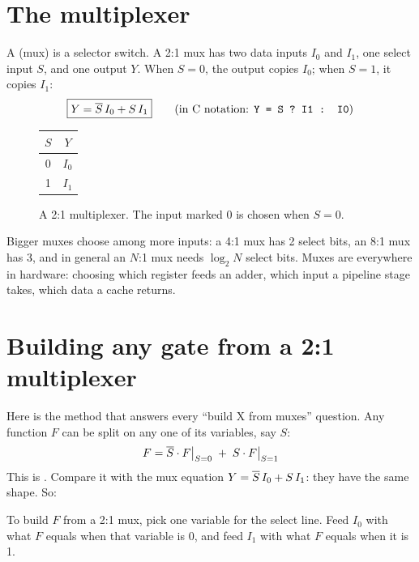 \section{The multiplexer}

A  (mux) is a selector switch. A 2:1 mux has two data inputs $I_0$ and $I_1$, one select input $S$, and one output $Y$. When $S = 0$, the output copies $I_0$; when $S = 1$, it copies $I_1$:
\[
  \boxed{Y = \overline{S}\,I_0 + S\,I_1} \qquad\text{(in C notation: \texttt{Y = S ? I1 : I0})}
\]

\begin{figure}[h]
\centering
{}
\hspace{1.5cm}
\begin{tabular}[b]{c|c}
\toprule
$S$ & $Y$ \\
\midrule
0 & $I_0$ \\
1 & $I_1$ \\
\bottomrule
\end{tabular}
\caption{A 2:1 multiplexer. The input marked 0 is chosen when $S = 0$.}
\label{fig:mux}
\end{figure}

Bigger muxes choose among more inputs: a 4:1 mux has 2 select bits, an 8:1 mux has 3, and in general an $N$:1 mux needs $\log_2 N$ select bits. Muxes are everywhere in hardware: choosing which register feeds an adder, which input a pipeline stage takes, which data a cache returns.

\section{Building any gate from a 2:1 multiplexer}
\label{sec:muxgates}

Here is the method that answers every ``build X from muxes'' question. Any function $F$ can be split on any one of its variables, say $S$:
\[
  F = \overline{S}\cdot F\big|_{S=0} \;+\; S\cdot F\big|_{S=1}
\]
This is . Compare it with the mux equation $Y = \overline{S}\,I_0 + S\,I_1$: they have the same shape. So:

\begin{bigidea}
To build $F$ from a 2:1 mux, pick one variable for the select line. Feed $I_0$ with what $F$ equals when that variable is 0, and feed $I_1$ with what $F$ equals when it is 1.
\end{bigidea}

